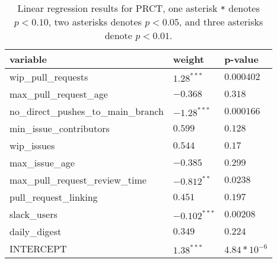 \renewcommand{\arraystretch}{1.2}
\begin{table}
\begin{center}
\begin{tabular}{|p{6cm}|p{4cm}|p{4cm}|} 
\hline
variable & weight & p-value \\ [0.5ex]
\hline\hline

wip\_pull\_requests & $1.28^{***}$ & $0.000402$ \\
max\_pull\_request\_age & $-0.368$ & $0.318$ \\
no\_direct\_pushes\_to\_main\_branch & $-1.28^{***}$ & $0.000166$ \\
min\_issue\_contributors & $0.599$ & $0.128$ \\
wip\_issues & $0.544$ & $0.17$ \\
max\_issue\_age & $-0.385$ & $0.299$ \\
max\_pull\_request\_review\_time & $-0.812^{**}$ & $0.0238$ \\
pull\_request\_linking & $0.451$ & $0.197$ \\
slack\_users & $-0.102^{***}$ & $0.00208$ \\
daily\_digest & $0.349$ & $0.224$ \\

\hline\hline
INTERCEPT & $1.38^{***}$ & $4.84*10^{-6}$ \\ 

\hline
\end{tabular}
\caption{Linear regression results for PRCT, one asterisk \texttt{*} denotes  $p < 0.10$, two asterisks denotes $p < 0.05$, and three asterisks denote $p < 0.01$.}
\label{tab:lmResults}
\end{center}
\end{table}